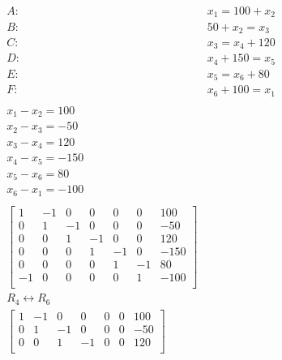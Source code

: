 \documentclass[12pt letter openany]{report}
\begin{document}
\begin{align*}
  A: & x_1  = 100 + x_2              \\
  B: & 50 + x_2 = x_3                \\
  C: & x_3 = x_4 + 120               \\
  D: & x_4 + 150 = x_5               \\
  E: & x_5 = x_6 + 80                \\
  F: & x_6 + 100 = x_1               \\
  \\
  x_1 - x_2 = 100                    \\
  x_2 - x_3 = -50                    \\
  x_3 - x_4 = 120                    \\
  x_4 - x_5 = -150                   \\
  x_5 - x_6 = 80                     \\
  x_6 - x_1 = -100                   \\
  \\
  \begin{bmatrix}
    1  & -1 & 0  & 0  & 0  & 0  & 100  \\
    0  & 1  & -1 & 0  & 0  & 0  & -50  \\
    0  & 0  & 1  & -1 & 0  & 0  & 120  \\
    0  & 0  & 0  & 1  & -1 & 0  & -150 \\
    0  & 0  & 0  & 0  & 1  & -1 & 80   \\
    -1 & 0  & 0  & 0  & 0  & 1  & -100 \\
  \end{bmatrix} \\
  R_4 \leftrightarrow R_6            \\
  \begin{bmatrix}
    1  & -1 & 0  & 0  & 0  & 0  & 100  \\
    0  & 1  & -1 & 0  & 0  & 0  & -50  \\
    0  & 0  & 1  & -1 & 0  & 0  & 120  \\

\end{bmatrix}
\end{align*}
\end{document}
